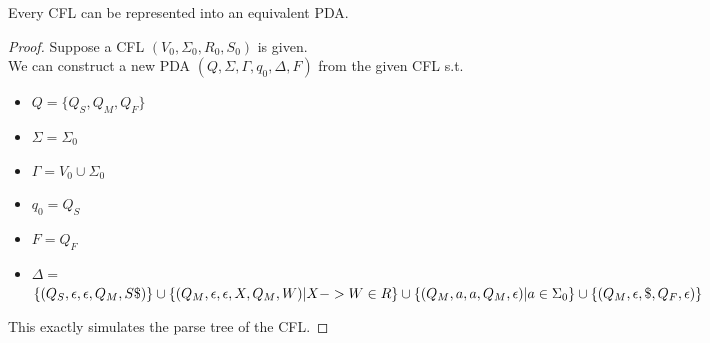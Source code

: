 \documentclass{report}
\begin{document}
			\begin{thm} \label{thm_cfl_pda_equivalence}
				Every CFL can be represented into an equivalent PDA.
			\end{thm}
		
			\begin{proof}
				Suppose a CFL $(V_0,\Sigma_0,R_0,S_0)$ is given.\\
				We can construct a new PDA $(Q,\Sigma,\Gamma,q_0,\Delta,F)$ from the given CFL s.t.
				\begin{itemize}
					\item $Q=\{Q_S,Q_M,Q_F\}$
					\item $\Sigma=\Sigma_0$
					\item $\Gamma=V_0 \cup \Sigma_0$
					\item $q_0=Q_S$
					\item $F=Q_F$
					\item $\Delta=$\\
					\begin{math}
					\{(Q_S,\epsilon,\epsilon,Q_M,S\$)\}\cup\\
					\{(Q_M,\epsilon,\epsilon,X,Q_M,W)|X->W \in R\}\cup\\
					\{(Q_M,a,a,Q_M,\epsilon)|a \in \Sigma_0\}\cup\\
					\{(Q_M,\epsilon,\$,Q_F,\epsilon)\}
					\end{math}
				\end{itemize}
				This exactly simulates the parse tree of the CFL.
			\end{proof}
	
\end{document}
